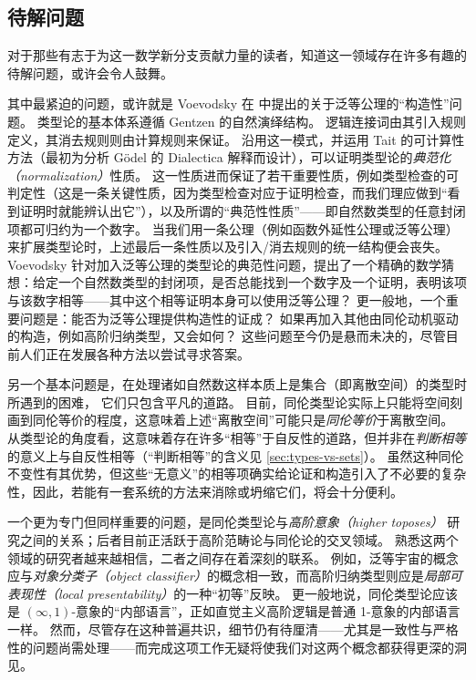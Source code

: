 %

\subsection*{待解问题} 

%

对于那些有志于为这一数学新分支贡献力量的读者，知道这一领域存在许多有趣的待解问题，或许会令人鼓舞。

%
其中最紧迫的问题，或许就是 Voevodsky 在 \cite{Universe-poly} 中提出的关于泛等公理的``构造性''问题。
类型论的基本体系遵循 Gentzen 的自然演绎结构。
逻辑连接词由其引入规则定义，其消去规则则由计算规则来保证。
沿用这一模式，并运用 Tait 的可计算性方法（最初为分析 Gödel 的 Dialectica 解释而设计），可以证明类型论的\emph{典范化（normalization）}性质。
这一性质进而保证了若干重要性质，例如类型检查的可判定性（这是一条关键性质，因为类型检查对应于证明检查，而我们理应做到``看到证明时就能辨认出它''），以及所谓的``典范性性质''——即自然数类型的任意封闭项都可归约为一个数字。
当我们用一条公理（例如函数外延性公理或泛等公理）来扩展类型论时，上述最后一条性质以及引入/消去规则的统一结构便会丧失。
Voevodsky 针对加入泛等公理的类型论的典范性问题，提出了一个精确的数学猜想：给定一个自然数类型的封闭项，是否总能找到一个数字及一个证明，表明该项与该数字相等——其中这个相等证明本身可以使用泛等公理？
更一般地，一个重要问题是：能否为泛等公理提供构造性的证成？
如果再加入其他由同伦动机驱动的构造，例如高阶归纳类型，又会如何？
这些问题至今仍是悬而未决的，尽管目前人们正在发展各种方法以尝试寻求答案。

另一个基本问题是，在处理诸如自然数这样本质上是集合（即离散空间）的类型时所遇到的困难，
%
它们只包含平凡的道路。
目前，同伦类型论实际上只能将空间刻画到同伦等价的程度，这意味着上述``离散空间''可能只是\emph{同伦等价}于离散空间。
从类型论的角度看，这意味着存在许多``相等''于自反性的道路，但并非在\emph{判断相等}的意义上与自反性相等（``判断相等''的含义见 \cref{sec:types-vs-sets}）。
虽然这种同伦不变性有其优势，但这些``无意义''的相等项确实给论证和构造引入了不必要的复杂性，因此，若能有一套系统的方法来消除或坍缩它们，将会十分便利。

一个更为专门但同样重要的问题，是同伦类型论与\emph{高阶意象（higher toposes）}%
研究之间的关系；后者目前正活跃于高阶范畴论与同伦论的交叉领域。
熟悉这两个领域的研究者越来越相信，二者之间存在着深刻的联系。
例如，泛等宇宙的概念应与\emph{对象分类子（object classifier）}的概念相一致，而高阶归纳类型则应是\emph{局部可表现性（local presentability）}的一种``初等''反映。
更一般地说，同伦类型论应该是 $(\infty,1)$-意象的``内部语言''，正如直觉主义高阶逻辑是普通 1-意象的内部语言一样。
然而，尽管存在这种普遍共识，细节仍有待厘清——尤其是一致性与严格性的问题尚需处理——而完成这项工作无疑将使我们对这两个概念都获得更深的洞见。

